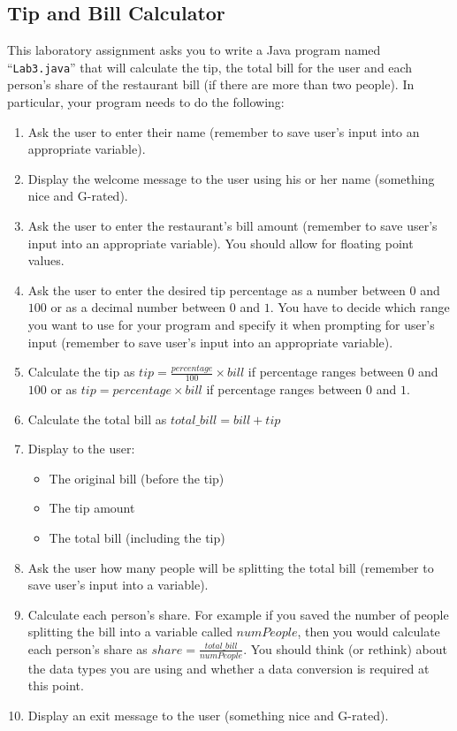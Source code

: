 \subsection*{Tip and Bill Calculator}
This laboratory assignment asks you to write a Java program named ``{\tt Lab3.java}'' that will calculate the tip, the total bill for the user and each person's share of the restaurant bill (if there are more than two people). In particular, your program needs to do the following: 
\begin{enumerate}
\item Ask the user to enter their name (remember to save user's input into an appropriate variable).
\item Display the welcome message to the user using his or her name (something nice and G-rated).
\item Ask the user to enter the restaurant's bill amount (remember to save user's input into an appropriate variable). You should allow for floating point values.
\item Ask the user to enter the desired tip percentage as a number between $0$ and $100$ or as a decimal number between $0$ and $1$. You have to decide which range you want to use for your program and specify it when prompting for user's input (remember to save user's input into an appropriate variable).
\item Calculate the tip as $tip = \frac{percentage}{100} \times bill$ if percentage ranges between $0$ and $100$ or as $tip = percentage \times bill$ if percentage ranges between $0$ and $1$.
\item Calculate the total bill as $total\_bill = bill+tip$
\item Display to the user:
	\begin{itemize}
		\item The original bill (before the tip)
		\item The tip amount
		\item The total bill (including the tip)
	\end{itemize}
\item Ask the user how many people will be splitting the total bill (remember to save user's input into a variable).
\item Calculate each person's share. For example if you saved the number of people splitting the bill into a variable called $numPeople$, then you would calculate each person's share as $share = \frac{total\_bill}{numPeople}$. You should think (or rethink) about the data types you are using and whether a data conversion is required at this point. 
\item Display an exit message to the user (something nice and G-rated).
\end{enumerate}

